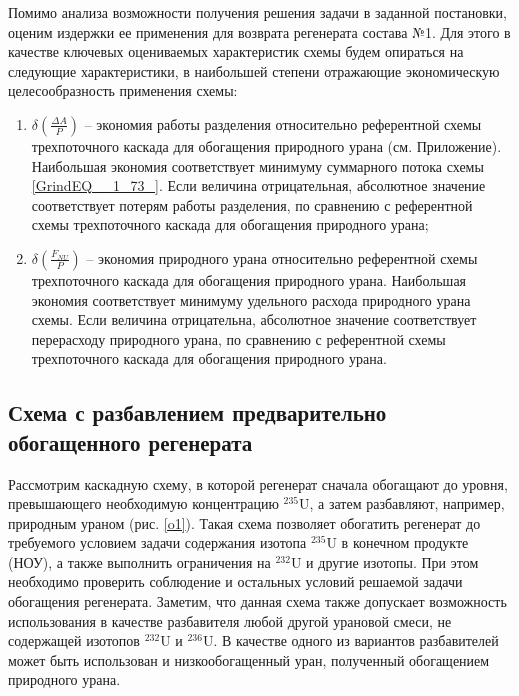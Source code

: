 Помимо анализа возможности получения решения задачи в заданной постановки, оценим издержки ее применения для возврата регенерата состава №1. 
Для этого в качестве ключевых оцениваемых характеристик схемы будем опираться на следующие характеристики, в наибольшей степени отражающие экономическую целесообразность применения схемы:
\begin{enumerate}
    \item $\delta(\frac{\Delta A}{P})$ -- экономия работы разделения относительно референтной схемы трехпоточного каскада для обогащения природного урана (см. Приложение). Наибольшая экономия соответствует минимуму суммарного потока схемы \ref{GrindEQ__1_73_}. Если величина отрицательная, абсолютное значение соответствует потерям работы разделения, по сравнению с референтной схемы трехпоточного каскада для обогащения природного урана;
    \item $\delta(\frac{F_{NU}}{P})$ -- экономия природного урана относительно референтной схемы трехпоточного каскада для обогащения природного урана.  Наибольшая экономия соответствует минимуму удельного расхода природного урана схемы. Если величина отрицательна, абсолютное значение соответствует перерасходу природного урана, по сравнению с референтной схемы трехпоточного каскада для обогащения природного урана.
\end{enumerate}

\subsection{Схема с разбавлением предварительно обогащенного регенерата}

Рассмотрим каскадную схему, в которой регенерат сначала обогащают до уровня, превышающего необходимую концентрацию $^{235}$U, а затем разбавляют, например, природным ураном (рис. \ref{o1}). Такая схема позволяет обогатить регенерат до требуемого условием задачи содержания изотопа $^{235}$U в конечном продукте (НОУ), а также выполнить ограничения на $^{232}$U и другие изотопы. При этом необходимо проверить соблюдение и остальных условий решаемой задачи обогащения регенерата. Заметим, что данная схема также допускает возможность использования в качестве разбавителя любой другой урановой смеси, не содержащей изотопов $^{232}$U и $^{236}$U. В качестве одного из вариантов разбавителей может быть использован и низкообогащенный уран, полученный обогащением природного урана.

